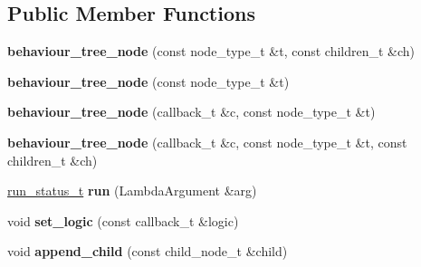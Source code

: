 \subsection*{Public Member Functions}
\begin{DoxyCompactItemize}
\item 
\mbox{\label{structmods_1_1behaviour__tree__node_acde0392957abfb14f4161f11d948137a}} 
{\bfseries behaviour\+\_\+tree\+\_\+node} (const node\+\_\+type\+\_\+t \&t, const children\+\_\+t \&ch)
\item 
\mbox{\label{structmods_1_1behaviour__tree__node_a41338ee34f1210cd5387a67c072f20e5}} 
{\bfseries behaviour\+\_\+tree\+\_\+node} (const node\+\_\+type\+\_\+t \&t)
\item 
\mbox{\label{structmods_1_1behaviour__tree__node_af399325d6a69f0a05b98f2ab50961381}} 
{\bfseries behaviour\+\_\+tree\+\_\+node} (callback\+\_\+t \&c, const node\+\_\+type\+\_\+t \&t)
\item 
\mbox{\label{structmods_1_1behaviour__tree__node_a3aa8a8d1de73e4344109b47f6bc658d4}} 
{\bfseries behaviour\+\_\+tree\+\_\+node} (callback\+\_\+t \&c, const node\+\_\+type\+\_\+t \&t, const children\+\_\+t \&ch)
\item 
\mbox{\label{structmods_1_1behaviour__tree__node_aa8d1c50b8200f6d0ee9410ec9971f9f4}} 
\hyperlink{structmods_1_1behaviour__tree__node_1_1run__status__t}{run\+\_\+status\+\_\+t} {\bfseries run} (Lambda\+Argument \&arg)
\item 
\mbox{\label{structmods_1_1behaviour__tree__node_a74c60315f5f5e456bb0fd22d3598d13c}} 
void {\bfseries set\+\_\+logic} (const callback\+\_\+t \&logic)
\item 
\mbox{\label{structmods_1_1behaviour__tree__node_a237cad45e25061fd5c48d009530bdd2e}} 
void {\bfseries append\+\_\+child} (const child\+\_\+node\+\_\+t \&child)
\item 
\mbox{\label{structmods_1_1behaviour__tree__node_ae4c220e640f4d578eeaddb871a5dbf29}} 

\end{DoxyCompactItemize}
